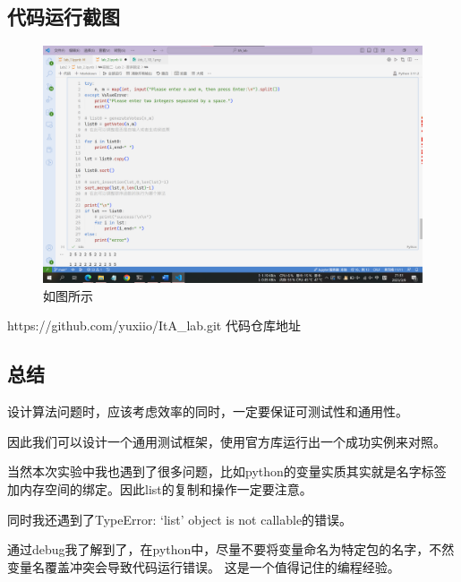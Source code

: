 \documentclass[11pt]{article}
\begin{document}
    \hypertarget{ux4ee3ux7801ux8fd0ux884cux622aux56fe}{%
\subsection{代码运行截图}\label{ux4ee3ux7801ux8fd0ux884cux622aux56fe}}

\begin{figure}
\centering
\includegraphics{./img/1.png}
\caption{如图所示}
\end{figure}

https://github.com/yuxiio/ItA\_lab.git 代码仓库地址

\hypertarget{ux603bux7ed3}{%
\subsection{总结}\label{ux603bux7ed3}}

设计算法问题时，应该考虑效率的同时，一定要保证可测试性和通用性。

因此我们可以设计一个通用测试框架，使用官方库运行出一个成功实例来对照。

当然本次实验中我也遇到了很多问题，比如python的变量实质其实就是名字标签加内存空间的绑定。因此list的复制和操作一定要注意。

同时我还遇到了TypeError: `list' object is not callable的错误。

通过debug我了解到了，在python中，尽量不要将变量命名为特定包的名字，不然变量名覆盖冲突会导致代码运行错误。
这是一个值得记住的编程经验。


    
    
    
\end{document}

